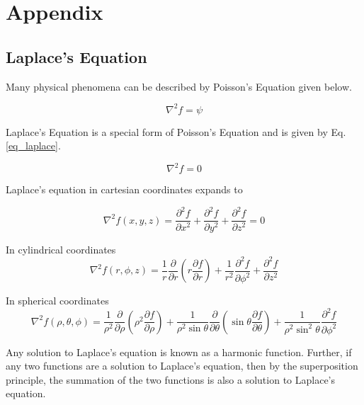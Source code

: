 \documentclass{article}
\numberwithin{equation}{subsection}
\begin{document}
\section{Appendix}

\subsection{Laplace's Equation} \label{sec_laplace}
Many physical phenomena can be described by Poisson's Equation given below.

\begin{equation} \label{eq_poisson}
\nabla^2 f = \psi
\end{equation}

Laplace's Equation is a special form of Poisson's Equation and is given by Eq. \ref{eq_laplace}.


\begin{equation} \label{eq_laplace}
\nabla^2 f = 0
\end{equation}

Laplace's equation in cartesian coordinates expands to

\begin{equation} \label{eq_laplace_cartesian}
\nabla^2 f(x, y, z) = \frac{\partial^2 f}{\partial x^2} + \frac{\partial^2 f}{\partial y^2} + \frac{\partial^2 f}{\partial z^2} = 0
\end{equation}

In cylindrical coordinates
\begin{equation} \label{eq_laplace_cylindrical}
\nabla^2 f(r, \phi, z) = \frac{1}{r} \frac{\partial}{\partial r}\left( r \frac{\partial f}{\partial r}\right) + \frac{1}{r^2}\frac{\partial^2 f}{\partial \phi^2} + \frac{\partial^2 f}{\partial z^2}
\end{equation}

In spherical coordinates
\begin{equation} \label{eq_laplace_spherical}
\nabla^2 f(\rho, \theta, \phi) = \frac{1}{\rho^2}\frac{\partial}{\partial \rho} \left( \rho^2 \frac{\partial f}{\partial \rho}\right) + \frac{1}{\rho^2 \sin \theta}\frac{\partial}{\partial \theta}\left( \sin \theta \frac{\partial f}{\partial \theta}\right) + \frac{1}{\rho^2 \sin^2 \theta} \frac{\partial^2 f}{\partial \phi^2}
\end{equation}

Any solution to Laplace's equation is known as a harmonic function. Further, if any two functions are a solution to Laplace's equation, then by the superposition principle, the summation of the two functions is also a solution to Laplace's equation.
\end{document}
